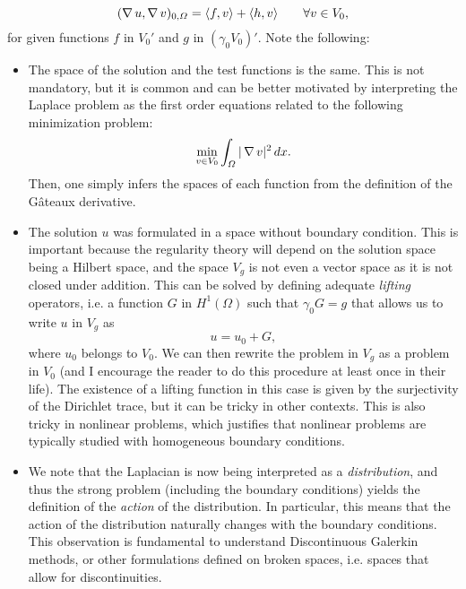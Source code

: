 \begin{equation}\label{eq:weak-form-poisson}
    (\operatorname{\nabla} u, \operatorname{\nabla} v)_{0,\Omega} = \langle f, v\rangle  + \langle h,  v\rangle \qquad \forall v\in V_0,
\end{equation}
for given functions $f$ in $V_0'$ and $g$ in $(\gamma_0 V_0)'$. Note the following: 
\begin{itemize}
    \item The space of the solution and the test functions is the same. This is not mandatory, but it is common and can be better motivated by interpreting the Laplace problem as the first order equations related to the following minimization problem: 
    \begin{equation*}
        \min_{v \in V_0} \int_\Omega |\operatorname{\nabla} v|^2\,dx .
    \end{equation*}
    Then, one simply infers the spaces of each function from the definition of the Gâteaux derivative. 
    \item The solution $u$ was formulated in a space without boundary condition. This is important because the regularity theory will depend on the solution space being a Hilbert space, and the space $V_g$ is not even a vector space as it is not closed under addition. This can be solved by defining adequate \emph{lifting} operators, i.e. a function $G$ in $H^1(\Omega)$ such that $\gamma_0 G = g$ that allows us to write $u$ in $V_g$ as 
    \begin{equation*}
        u = u_0 + G,
    \end{equation*}
    where $u_0$ belongs to $V_0$. We can then rewrite the problem in $V_g$ as a problem in $V_0$ (and I encourage the reader to do this procedure at least once in their life). The existence of a lifting function in this case is given by the surjectivity of the Dirichlet trace, but it can be tricky in other contexts. This is also tricky in nonlinear problems, which justifies that nonlinear problems are typically studied with homogeneous boundary conditions.  
    \item We note that the Laplacian is now being interpreted as a \emph{distribution}, and thus the strong problem (including the boundary conditions) yields the definition of the \emph{action} of the distribution. In particular, this means that the action of the distribution naturally changes with the boundary conditions. This observation is fundamental to understand Discontinuous Galerkin methods, or other formulations defined on broken spaces, i.e. spaces that allow for discontinuities. 
\end{itemize}

